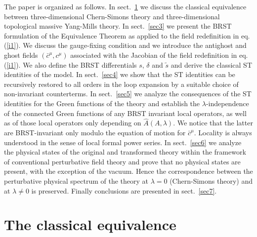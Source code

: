 \documentclass[a4paper,11pt]{article}
\begin{document}
The paper is organized as follows.
In sect.~\ref{sec2} we discuss the classical equivalence
between three-dimensional Chern-Simons theory and three-dimensional
topological massive Yang-Mills theory.
In sect.~\ref{sec3} we present the BRST formulation of the
Equivalence Theorem as applied to the field redefinition in eq.(\ref{i1}).
We discuss the gauge-fixing condition and we introduce the
antighost and ghost fields $(\bar c^\mu,c^\mu)$ associated
with the Jacobian of the field redefinition in eq.(\ref{i1}).
We also define the BRST differentials $s$, $\delta$ and $\tilde s$ and
derive the classical ST identities of the model.
In sect.~\ref{sec4} we show that the ST identities can be recursively restored
to all orders in the loop expansion by a suitable choice of non-invariant
counterterms. In sect.~\ref{sec5} we analyze the consequences of the
ST identities for the Green functions of the theory and establish
the $\lambda$-independence of the connected Green functions of any BRST 
invariant local operators, as well as of  those local
operators only depending on $\hat A(A,\lambda)$. 
We notice that the latter are BRST-invariant only modulo the equation of motion
for $\bar c^\mu$. Locality is always understood in the sense of local formal power
series.
In sect.~\ref{sec6} we analyze the physical states
of the original and transformed theory within the framework
of conventional perturbative field theory and prove that
no physical states are present, with the exception of the vacuum.
Hence the correspondence between the perturbative physical spectrum of
the theory at $\lambda=0$ (Chern-Simons theory) and at
$\lambda \neq 0$ is preserved.
%
Finally conclusions are presented in sect.~\ref{sec7}.

\section{The classical equivalence}\label{sec2}
\end{document}
